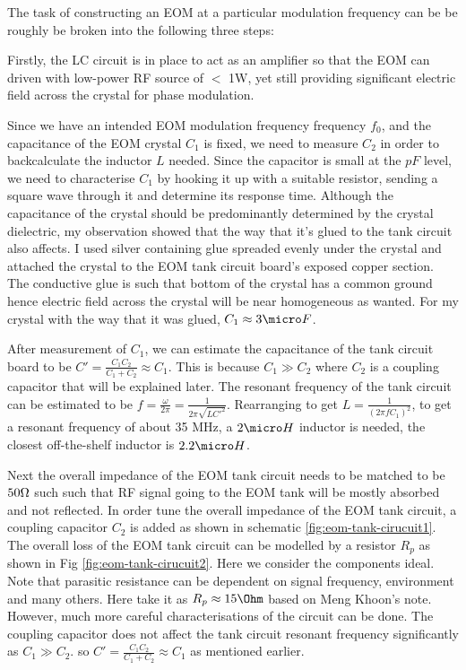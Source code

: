 \documentclass[11pt,A4Paper]{article}
\begin{document}
The task of constructing an EOM at a particular modulation frequency can be be roughly be broken into the following three steps:
\par
Firstly, the LC circuit is in place to act as an amplifier so that the EOM can driven with low-power RF source of $<$ 1W, yet still providing significant electric field across the crystal for phase modulation. 
\par
Since we have an intended EOM modulation frequency frequency $f_0$, and the capacitance of the EOM crystal $C_1$ is fixed, we need to measure $C_2$ in order to backcalculate the inductor $L$ needed. Since the capacitor is small at the $pF$ level, we need to characterise $C_1$ by hooking it up with a suitable resistor, sending a square wave through it and determine its response time. Although the capacitance of the crystal should be predominantly determined by the crystal dielectric, my observation showed that the way that it's glued to the tank circuit also affects. I used silver containing glue spreaded evenly under the crystal and attached the crystal to the EOM tank circuit board's exposed copper section. The conductive glue is such that bottom of the crystal has a common ground hence electric field across the crystal will be near homogeneous as wanted. For my crystal with the way that it was glued, $C_1 \approx 3 \micro F$.
\par
After measurement of $C_1$, we can estimate the capacitance of the tank circuit board to be $C' = \frac{C_1C_2}{C_1+C_2} \approx C_1$. This is because $C_1 \gg C_2$ where $C_2$ is a coupling capacitor that will be explained later. The resonant frequency of the tank circuit can be estimated to be $f = \frac{\omega}{2\pi} = \frac{1}{2\pi\sqrt{LC'^2}}$. Rearranging to get $L = \frac{1}{(2\pi f C_1)^2}$, to get a resonant frequency of about 35 MHz, a $2 \micro H$ inductor is needed, the closest off-the-shelf inductor is $2.2 \micro H$. 
\par
Next the overall impedance of the EOM tank circuit needs to be matched to be $50\ohm$ such such that RF signal going to the EOM tank will be mostly absorbed and not reflected. In order tune the overall impedance of the EOM tank circuit, a coupling capacitor $C_2$ is added as shown in schematic \ref{fig:eom-tank-cirucuit1}. The overall loss of the EOM tank circuit can be modelled by a resistor $R_p$ as shown in Fig \ref{fig:eom-tank-cirucuit2}. Here we consider the components ideal. Note that parasitic resistance can be dependent on signal frequency, environment and many others. Here take it as $ R_p \approx 15 \Ohm$ based on Meng Khoon's note. However, much more careful characterisations of the circuit can be done. The coupling capacitor does not affect the tank circuit resonant frequency significantly as $C_1 \gg C_2$. so $C' = \frac{C_1C_2}{C_1+C_2} \approx C_1$ as mentioned earlier.  
\end{document}
